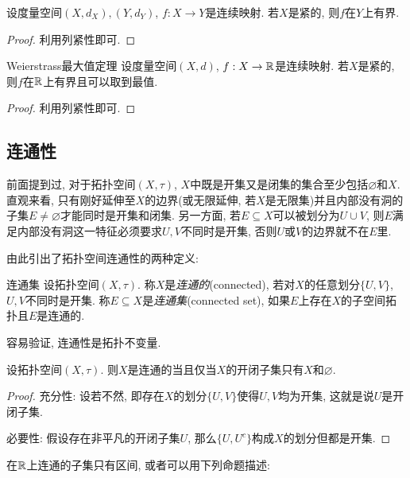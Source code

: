 \begin{theorem}{}
	设度量空间$(X,d_X),(Y,d_Y)$, $f:X \to Y$是连续映射. 若$X$是紧的, 则$f$在$Y$上有界. 
\end{theorem}
\begin{proof}
	利用列紧性即可. 
\end{proof}

\begin{theorem}{Weierstrass最大值定理}
	设度量空间$(X,d)$, $f:X \to \mathbb{R}$是连续映射. 若$X$是紧的, 则$f$在$\mathbb{R}$上有界且可以取到最值. 
\end{theorem}
\begin{proof}
	利用列紧性即可. 
\end{proof}

\subsection{连通性}

前面提到过, 对于拓扑空间$(X,\tau)$, $X$中既是开集又是闭集的集合至少包括$\varnothing$和$X$. 直观来看, 只有刚好延伸至$X$的边界(或无限延伸, 若$X$是无限集)并且内部没有洞的子集$E \neq \varnothing$才能同时是开集和闭集. 另一方面, 若$E \subseteq X$可以被划分为$U \cup V$, 则$E$满足内部没有洞这一特征必须要求$U,V$不同时是开集, 否则$U$或$V$的边界就不在$E$里. 

由此引出了拓扑空间连通性的两种定义: 

\begin{definition}{连通集}
	设拓扑空间$(X,\tau)$. 称$X$是\textit{连通的}(connected), 若对$X$的任意划分$\{ U,V \}$, $U,V$不同时是开集. 称$E \subseteq X$是\textit{连通集}(connected set), 如果$E$上存在$X$的子空间拓扑且$E$是连通的. 
\end{definition}

容易验证, 连通性是拓扑不变量. 

\begin{proposition}{}
	设拓扑空间$(X,\tau)$. 则$X$是连通的当且仅当$X$的开闭子集只有$X$和$\varnothing$. 
\end{proposition}
\begin{proof}
	充分性: 设若不然, 即存在$X$的划分$\{ U,V \}$使得$U,V$均为开集, 这就是说$U$是开闭子集. 
	
	必要性: 假设存在非平凡的开闭子集$U$, 那么$\{ U,U^c \}$构成$X$的划分但都是开集. 
\end{proof}

在$\mathbb{R}$上连通的子集只有区间, 或者可以用下列命题描述: 

